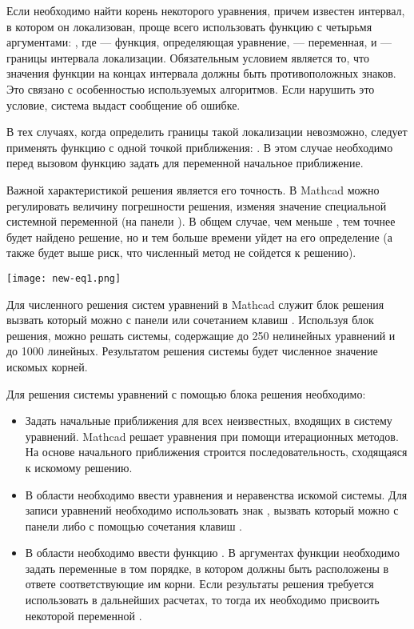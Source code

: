 Если необходимо найти корень некоторого уравнения, причем известен интервал, в котором он локализован, проще всего использовать функцию  с четырьмя аргументами: , где  --- функция, определяющая уравнение,  --- переменная,  и  --- границы интервала локализации. Обязательным условием является то, что значения функции на концах интервала должны быть противоположных знаков. Это связано с особенностью используемых  алгоритмов. Если нарушить это условие, система выдаст сообщение об ошибке.

В тех случаях, когда определить границы такой локализации невозможно, следует применять функцию  с одной точкой приближения: . В этом случае необходимо перед вызовом функцию  задать для переменной  начальное приближение.

Важной характеристикой решения является его точность. В Mathcad можно регулировать величину погрешности решения, изменяя значение специальной системной переменной  (на панели ). В общем случае, чем меньше , тем точнее будет найдено решение, но и тем больше времени уйдет на его определение (а также будет выше риск, что численный метод не сойдется к решению).

\begin{center}
	\texttt{[image: new-eq1.png]}
\end{center}

Для численного решения систем уравнений в Mathcad служит блок решения вызвать который можно с панели  или сочетанием клавиш . Используя блок решения, можно решать системы, содержащие до 250 нелинейных уравнений и до 1000 линейных. Результатом решения системы будет численное значение искомых корней.

Для решения системы уравнений с помощью блока решения необходимо:
\begin{itemize}
	\item Задать начальные приближения для всех неизвестных, входящих в систему уравнений. Mathcad решает уравнения при помощи итерационных методов. На основе начального приближения строится последовательность, сходящаяся к искомому решению.
	\item В области  необходимо ввести уравнения и неравенства искомой системы. Для записи уравнений необходимо использовать знак , вызвать который можно с панели  либо с помощью сочетания клавиш \keys{\ctrl+=}.
	\item В области  необходимо ввести функцию . В аргументах функции необходимо задать переменные в том порядке, в котором должны быть расположены в ответе соответствующие им корни. Если результаты решения требуется использовать в дальнейших расчетах, то тогда их необходимо присвоить некоторой переменной .
\end{itemize}

